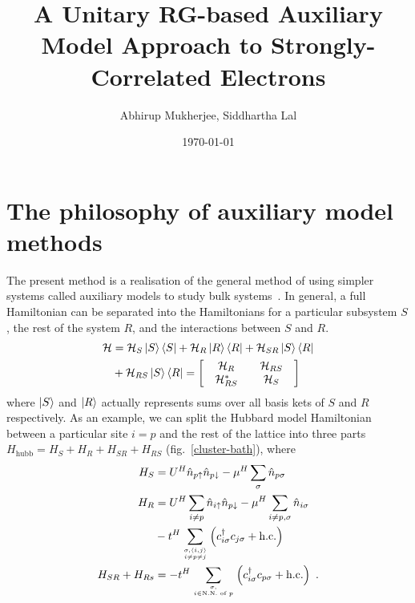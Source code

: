 \documentclass[reprint,hidelinks,onecolumn]{revtex4-2}
\begin{document}
\title{\bf A Unitary RG-based Auxiliary Model Approach to Strongly-Correlated Electrons}
\author{Abhirup Mukherjee, Siddhartha Lal}
\date{\today}
\maketitle
\tableofcontents


\section{The philosophy of auxiliary model methods}

The present method is a realisation of the general method of using simpler systems called auxiliary models to study bulk systems~\cite{martin_2016}. In general, a full Hamiltonian can be separated into the Hamiltonians for a particular subsystem \(S\), the rest of the system \(R\), and the interactions between \(S\) and \(R\).
\begin{equation}\begin{aligned}
	\mathcal{H} &= \mathcal{H}_S\ket{S}\bra{S} + \mathcal{H}_R \ket{R}\bra{R} + \mathcal{H}_{SR} \ket{S}\bra{R} \\
				&+ \mathcal{H}_{RS}\ket{S}\bra{R} = \begin{bmatrix} & \mathcal{H}_{R} && \mathcal{H}_{RS} & \\ & \mathcal{H}_{RS}^* && \mathcal{H}_{S} & \end{bmatrix}
\end{aligned}\end{equation}
where \(\ket{S}\) and \(\ket{R}\) actually represents sums over all basis kets of \(S\) and \(R\) respectively. As an example, we can split the Hubbard model Hamiltonian between a particular site \(i = p\) and the rest of the lattice into three parts \(H_\text{hubb} = H_S + H_R + H_{SR} + H_{RS}\) (fig.~\ref{cluster-bath}), where
\begin{equation}\begin{aligned}
	H_S &= U^H\hat n_{p \uparrow} \hat n_{p \downarrow} - \mu^H \sum_\sigma \hat n_{p \sigma}\\
	H_R &= U^H\sum_{i \neq p}\hat n_{i \uparrow} \hat n_{p \downarrow} - \mu^H \sum_{i \neq p, \sigma} \hat n_{i \sigma} \\
		&-t^H\sum_{\sigma,\left<i,j \right>\atop{i \neq p \neq j}}\left(c^\dagger_{i\sigma} c_{j\sigma} + \text{h.c.}\right) \\
	H_{SR} + H_{Rs} &= - t^H\sum_{\sigma,\atop{i \in \text{N.N. of }p}}\left(c^\dagger_{i\sigma} c_{p\sigma} + \text{h.c.}\right)~.
\end{aligned}\end{equation}
\end{document}
